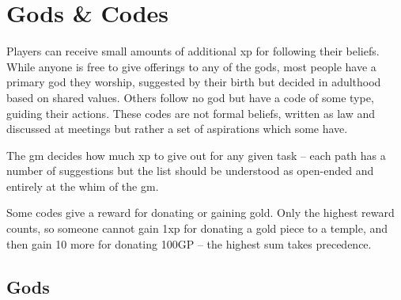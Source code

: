 \chapter[Gods \& Codes]{Gods \& Codes}
\label{gods_codes}

\begin{multicols}{2}

Players can receive small amounts of additional \gls{xp} for following their beliefs. While anyone is free to give offerings to any of the gods, most people have a primary god they worship, suggested by their birth but decided in adulthood based on shared values. Others follow no god but have a code of some type, guiding their actions. These codes are not formal beliefs, written as law and discussed at meetings but rather a set of aspirations which some have.

The \gls{gm} decides how much \gls{xp} to give out for any given task -- each path has a number of suggestions but the list should be understood as open-ended and entirely at the whim of the \gls{gm}.

Some codes give a reward for donating or gaining gold.  Only the highest reward counts, so someone cannot gain 1\gls{xp} for donating a gold piece to a temple, and then gain 10 more for donating 100GP -- the highest sum takes precedence.

\end{multicols}

\section{Gods}

